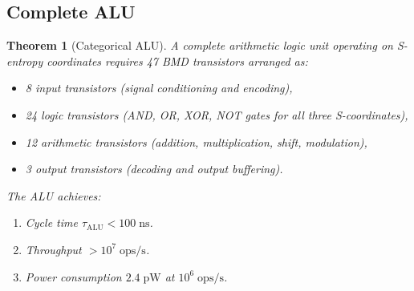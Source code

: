 \documentclass[twocolumn,10pt]{article}
\newtheorem{theorem}{Theorem}[section]
\theoremstyle{remark}
\begin{document}
\subsection{Complete ALU}

\begin{theorem}[Categorical ALU]
\label{thm:alu}
A complete arithmetic logic unit operating on S-entropy coordinates requires 47 BMD transistors arranged as:
\begin{itemize}
\item 8 input transistors (signal conditioning and encoding),
\item 24 logic transistors (AND, OR, XOR, NOT gates for all three S-coordinates),
\item 12 arithmetic transistors (addition, multiplication, shift, modulation),
\item 3 output transistors (decoding and output buffering).
\end{itemize}
The ALU achieves:
\begin{enumerate}
\item Cycle time $\tau_{\mathrm{ALU}} < 100\;\mathrm{ns}$.
\item Throughput $> 10^7\;\mathrm{ops/s}$.
\item Power consumption $2.4\;\mathrm{pW}$ at $10^6\;\mathrm{ops/s}$.
\end{enumerate}
\end{theorem}
\end{document}
